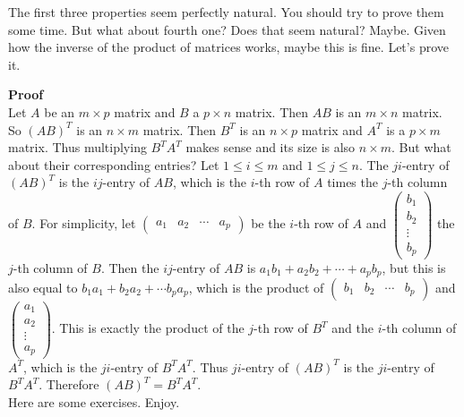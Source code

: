 \documentclass[12pt]{article}
\def\colp#1{\begin{pmatrix} #1_1 \\ #1_2 \\ \vdots \\ #1_p \end{pmatrix}}
\def\rowp#1{\begin{pmatrix} #1_1 & #1_2 & \cdots & #1_p \end{pmatrix}}
\begin{document}
The first three properties seem perfectly natural. You should try to prove them some time. But what about fourth one? Does that seem natural? Maybe. Given how the inverse of the product of matrices works, maybe this is fine. Let's prove it. 

{\bf Proof} \\
Let $A$ be an $m \times p$ matrix and $B$ a $p \times n$ matrix. Then $AB$ is an $m \times n$ matrix. So $(AB)^T$ is an $n \times m$ matrix. Then $B^T$ is an $n \times p$ matrix and $A^T $ is a $p \times m$ matrix. Thus multiplying $B^T A^T$ makes sense and its size is also $n \times m$. But what about their corresponding entries? Let $1 \leq i \leq m$ and $1 \leq j \leq n$. The $ji$-entry of $(AB)^T$ is the $ij$-entry of $AB$, which is the $i$-th row of $A$ times the $j$-th column of $B$. For simplicity, let $\rowp{a}$ be the $i$-th row of $A$ and $\colp{b}$ the $j$-th column of $B$. Then the $ij$-entry of $AB$ is $a_1 b_1 + a_2 b_2 + \cdots + a_p b_p$, but this is also equal to $b_1 a_1 + b_2 a_2 + \cdots b_p a_p$, which is the product of $\rowp{b}$ and $\colp{a}$. This is exactly the product of the $j$-th row of $B^T$ and the $i$-th column of $A^T$, which is the $ji$-entry of $B^T A^T$. Thus $ji$-entry of $(AB)^T$ is the $ji$-entry of $B^T A^T$. Therefore $(AB)^T = B^T A^T$. \\

{\large Here are some exercises. Enjoy.}
\end{document}
